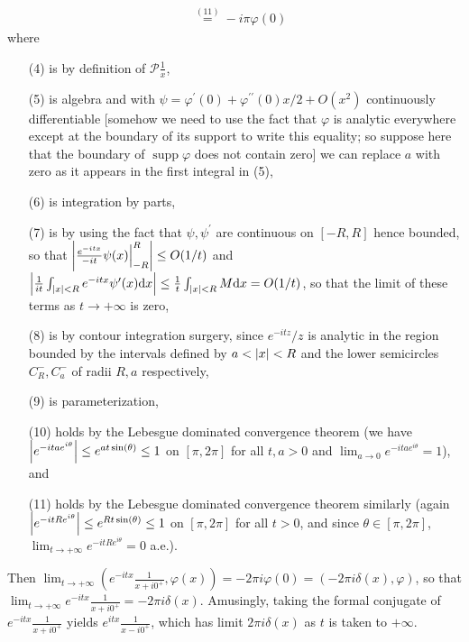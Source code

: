 \documentclass[11pt]{article}
\newcommand{\eq}[1]{\overset{(#1)}{=}}
\DeclareMathOperator{\supp}{supp}
\begin{document}
\begin{enumerate}
\begin{align*}
        &\eq{11} -i\pi\varphi(0)
    \end{align*} where \begin{enumerate}
        \item[(4)] is by definition of $\mathcal{P}\frac{1}{x}$,
        \item[(5)] is algebra and with $\psi = \varphi^\prime(0) + \varphi^{\prime\prime}(0)x/2+ O(x^2)$ continuously differentiable [somehow we need to use the fact that $\varphi$ is analytic everywhere except at the boundary of its support to write this equality; so suppose here that the boundary of $\supp\varphi$ does not contain zero] we can replace $a$ with zero as it appears in the first integral in (5),
        \item[(6)] is integration by parts,
        \item[(7)] is by using the fact that $\psi,\psi^\prime$ are continuous on $[-R,R]$ hence bounded, so that $\abs{\frac{e^{-itx}}{-it}\psi(x)\Big|_{-R}^R} \leq O(1/t)$ and $\abs{\frac{1}{it}\int_{\abs{x}<R}e^{-itx}\psi^\prime(x)\dd x}\leq \frac{1}{t}\int_{\abs{x}<R}M\dd x = O(1/t)$, so that the limit of these terms as $t\to +\infty$ is zero,
        \item[(8)] is by contour integration surgery, since $e^{-itz}/z$ is analytic in the region bounded by the intervals defined by $a<\abs{x}<R$ and the lower semicircles $C_R^-,C_a^-$ of radii $R,a$ respectively,
        \item[(9)] is parameterization,
        \item[(10)] holds by the Lebesgue dominated convergence theorem (we have $\abs{e^{-itae^{i\theta}}}\leq e^{at\sin(\theta)}\leq 1$ on $[\pi,2\pi]$ for all $t,a>0$ and $\lim_{a\to 0}e^{-itae^{i\theta}} = 1$), and
        \item[(11)] holds by the Lebesgue dominated convergence theorem similarly (again $\abs{e^{-itRe^{i\theta}}}\leq e^{Rt\sin(\theta)}\leq 1$ on $[\pi,2\pi]$ for all $t>0$, and since $\theta\in [\pi,2\pi]$, $\lim_{t\to +\infty}e^{-itRe^{i\theta}} = 0$ a.e.).
    \end{enumerate}
    Then $\lim_{t\to+\infty}(e^{-itx}\frac{1}{x+i0^+},\varphi(x)) = -2\pi i\varphi(0) = (-2\pi i\delta(x),\varphi)$, so that $\lim_{t\to +\infty}e^{-itx}\frac{1}{x+i0^+} = -2\pi i \delta(x)$.
    Amusingly, taking the formal conjugate of $e^{-itx}\frac{1}{x+i0^+}$ yields $e^{itx}\frac{1}{x-i0^+}$, which has limit $2\pi i \delta(x)$ as $t$ is taken to $+\infty$.

    \hrulefill


\end{enumerate}
\end{document}
